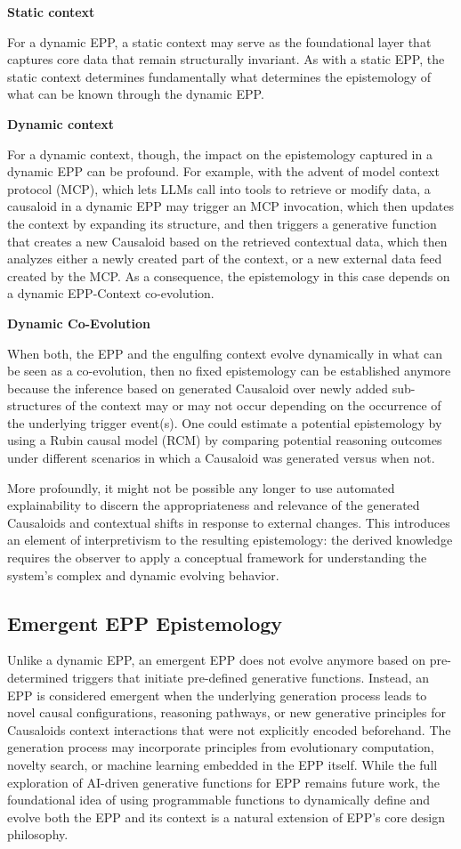 \textbf{Static context}

For a dynamic EPP, a static context may serve as the foundational layer that captures core data that remain structurally invariant. As with a static EPP, the static context determines fundamentally what determines the epistemology of what can be known through the dynamic EPP.

\textbf{Dynamic context}

For a dynamic context, though, the impact on the epistemology captured in a dynamic EPP can be profound. For example, with the advent of model context protocol (MCP), which lets LLMs call into tools to retrieve or modify data, a causaloid in a dynamic EPP may trigger an MCP invocation, which then updates the context by expanding its structure, and then triggers a generative function that creates a new Causaloid based on the retrieved contextual data, which then analyzes either a newly created part of the context, or a new external data feed created by the MCP. As a consequence, the epistemology in this case depends on a dynamic EPP-Context co-evolution.

\textbf{Dynamic Co-Evolution}

When both, the EPP and the engulfing context evolve dynamically in what can be seen as a co-evolution, then no fixed epistemology can be established anymore because the inference based on generated Causaloid over newly added sub-structures of the context may or may not occur depending on the occurrence of the underlying trigger event(s). One could estimate a potential epistemology by using a Rubin causal model\cite{rubin2005causal} (RCM) by comparing potential reasoning outcomes under different scenarios in which a Causaloid was generated versus when not.

More profoundly, it might not be possible any longer to use automated explainability to discern the appropriateness and relevance of the generated Causaloids and contextual shifts in response to external changes. This introduces an element of interpretivism to the resulting epistemology: the derived knowledge requires the observer to apply a conceptual framework for understanding the system's complex and dynamic evolving behavior.

\subsection{Emergent EPP Epistemology}

Unlike a dynamic EPP, an emergent EPP does not evolve anymore based on pre-determined triggers that initiate pre-defined generative functions. Instead, an EPP is considered emergent when the underlying generation process leads to novel causal configurations, reasoning pathways, or new generative principles for Causaloids context interactions that were not explicitly encoded beforehand.
The generation process may incorporate principles from evolutionary computation, novelty search, or machine learning embedded in the EPP itself. While the full exploration of AI-driven generative functions for EPP remains future work, the foundational idea of using programmable functions to dynamically define and evolve both the EPP and its context is a natural extension of EPP's core design philosophy.

